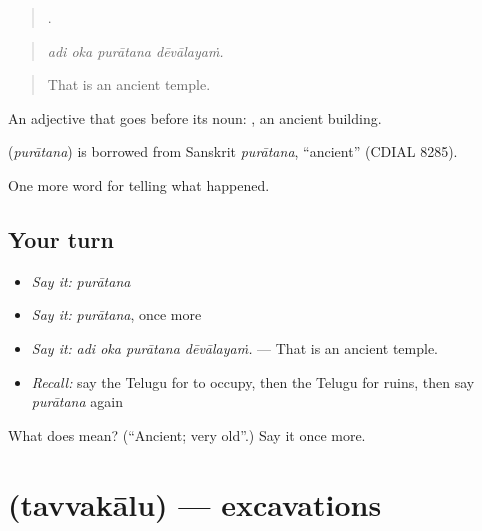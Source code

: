 \begin{quote}
   .
\end{quote}

\begin{quote}
\emph{adi oka purātana dēvālayaṁ.}
\end{quote}

\begin{quote}
That is an ancient temple.
\end{quote}

An adjective that goes before its noun:  , an ancient building.

\begin{cousinweb}
\textbf{} (\emph{purātana}) is borrowed from Sanskrit \emph{purātana}, \textquotedblleft{}ancient\textquotedblright{} (CDIAL 8285).
\end{cousinweb}

\begin{grammarlens}[title={What you've built}]
One more word for telling what happened.
\end{grammarlens}

\subsection*{Your turn}
\begin{itemize}
\raggedright
  \item \emph{Say it:} \emph{purātana}
  \item \emph{Say it:} \emph{purātana}, once more
  \item \emph{Say it:} \emph{adi oka purātana dēvālayaṁ.} — That is an ancient temple.
  \item \emph{Recall:} say the Telugu for to occupy, then the Telugu for ruins, then say \emph{purātana} again
\end{itemize}

\begin{tcolorbox}[breakable,colback=teal!4,colframe=teal!35!black,title={Before you move on}]
What does  mean? (\textquotedblleft{}Ancient; very old\textquotedblright{}.) Say it once more.
\end{tcolorbox}
\section[\texorpdfstring{\te{తవ్వకాలు} (tavvakālu)}{తవ్వకాలు (tavvakālu)}]{ (tavvakālu) — excavations}

